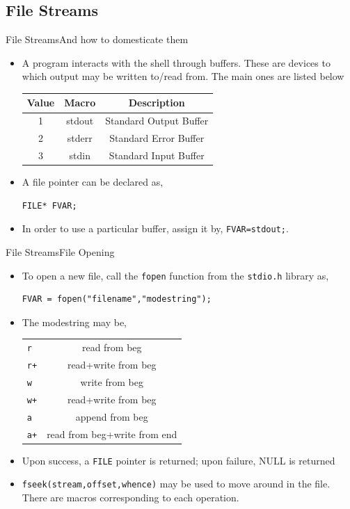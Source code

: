 \documentclass{beamer}
\begin{document}
\subsection{File Streams}
\begin{frame}[fragile]{File Streams}{And how to domesticate them}
\begin{itemize}
\item A program interacts with the shell through buffers. These are devices to which output may be written to/read from. The main ones are listed below
\begin{center}
\begin{tabular}{|c|c|c|}
\hline
\textbf{Value}&\textbf{Macro}&\textbf{Description}\\
\hline
1&stdout&Standard Output Buffer\\
2&stderr&Standard Error Buffer\\
3&stdin&Standard Input Buffer\\
\hline
\end{tabular}
\end{center}
\item A file pointer can be declared as,
\begin{verbatim}
FILE* FVAR;
\end{verbatim}
\item In order to use a particular buffer, assign it by, \verb|FVAR=stdout;|. 
\end{itemize}
\end{frame}

\begin{frame}[fragile]{File Streams}{File Opening}
\begin{itemize}
\item To open a new file, call the \verb|fopen| function from the \verb|stdio.h| library as,
\begin{verbatim}
FVAR = fopen("filename","modestring");
\end{verbatim}
\item The modestring may be,
\begin{center}
\begin{tabular}{|l|c|}
\hline
\verb|r|&read from beg\\
\verb|r+|&read+write from beg\\
\verb|w|&write from beg\\
\verb|w+|&read+write from beg\\
\verb|a|&append from beg\\
\verb|a+|&read from beg+write from end\\
\hline
\end{tabular}
\end{center}
\item Upon success, a \verb|FILE| pointer is returned; upon failure, NULL is returned
\item \verb|fseek(stream,offset,whence)| may be used to move around in the file. There are macros corresponding to each operation.
\end{itemize}
\end{frame}
\end{document}
